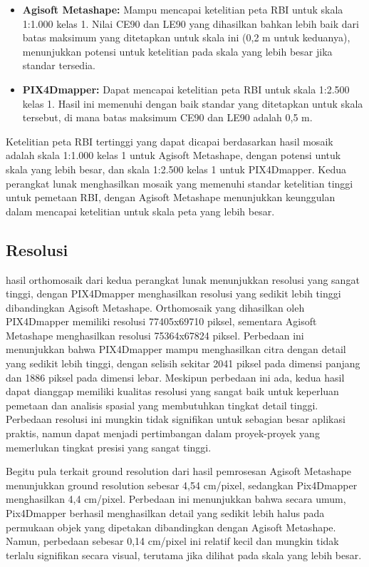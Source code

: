 \begin{itemize}
    \item \textbf{Agisoft Metashape:} Mampu mencapai ketelitian peta RBI untuk skala 1:1.000 kelas 1. Nilai CE90 dan LE90 yang dihasilkan bahkan lebih baik dari batas maksimum yang ditetapkan untuk skala ini (0,2 m untuk keduanya), menunjukkan potensi untuk ketelitian pada skala yang lebih besar jika standar tersedia.
    \item \textbf{PIX4Dmapper:} Dapat mencapai ketelitian peta RBI untuk skala 1:2.500 kelas 1. Hasil ini memenuhi dengan baik standar yang ditetapkan untuk skala tersebut, di mana batas maksimum CE90 dan LE90 adalah 0,5 m.
\end{itemize}

Ketelitian peta RBI tertinggi yang dapat dicapai berdasarkan hasil mosaik adalah skala 1:1.000 kelas 1 untuk Agisoft Metashape, dengan potensi untuk skala yang lebih besar, dan skala 1:2.500 kelas 1 untuk PIX4Dmapper. Kedua perangkat lunak menghasilkan mosaik yang memenuhi standar ketelitian tinggi untuk pemetaan RBI, dengan Agisoft Metashape menunjukkan keunggulan dalam mencapai ketelitian untuk skala peta yang lebih besar.

\subsection{Resolusi}

hasil orthomosaik dari kedua perangkat lunak menunjukkan resolusi yang sangat tinggi, dengan PIX4Dmapper menghasilkan resolusi yang sedikit lebih tinggi dibandingkan Agisoft Metashape. Orthomosaik yang dihasilkan oleh PIX4Dmapper memiliki resolusi 77405x69710 piksel, sementara Agisoft Metashape menghasilkan resolusi 75364x67824 piksel. Perbedaan ini menunjukkan bahwa PIX4Dmapper mampu menghasilkan citra dengan detail yang sedikit lebih tinggi, dengan selisih sekitar 2041 piksel pada dimensi panjang dan 1886 piksel pada dimensi lebar. Meskipun perbedaan ini ada, kedua hasil dapat dianggap memiliki kualitas resolusi yang sangat baik untuk keperluan pemetaan dan analisis spasial yang membutuhkan tingkat detail tinggi. Perbedaan resolusi ini mungkin tidak signifikan untuk sebagian besar aplikasi praktis, namun dapat menjadi pertimbangan dalam proyek-proyek yang memerlukan tingkat presisi yang sangat tinggi.

Begitu pula terkait ground resolution dari hasil pemrosesan Agisoft Metashape menunjukkan ground resolution sebesar 4,54 cm/pixel, sedangkan Pix4Dmapper menghasilkan 4,4 cm/pixel. Perbedaan ini menunjukkan bahwa secara umum, Pix4Dmapper berhasil menghasilkan detail yang sedikit lebih halus pada permukaan objek yang dipetakan dibandingkan dengan Agisoft Metashape. Namun, perbedaan sebesar 0,14 cm/pixel ini relatif kecil dan mungkin tidak terlalu signifikan secara visual, terutama jika dilihat pada skala yang lebih besar.

